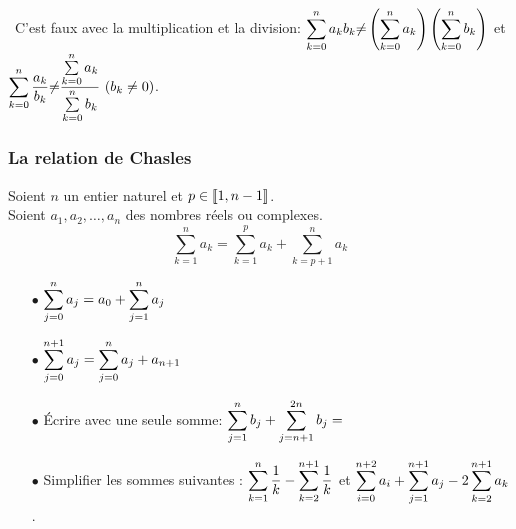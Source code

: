 \documentclass[a4paper, 11pt,reqno]{article}
\begin{document}


\noindent\warning\, C'est faux avec la multiplication et la division: $\displaystyle\sum\limits_{k=0}^n a_kb_k \boldmath{\not=} \left(\sum\limits_{k=0}^n a_k\right) \left(\sum\limits_{k=0}^n b_k\right)$ \; et \; 
$\displaystyle \sum\limits_{k=0}^n \displaystyle\frac{a_k}{b_k} \boldmath{\not=} \displaystyle\frac{\sum\limits_{k=0}^n a_k}{\sum\limits_{k=0}^n b_k}\ (b_k\not= 0)$.


\vspace{0.3cm}

\subsubsection{La relation de Chasles}



\begin{prop} 
Soient $n$ un entier naturel et $p\in\llbracket 1,n-1\rrbracket$.\\
Soient $a_1,a_2,\dots,a_n$ des nombres r\'eels ou complexes.
$$\sum\limits_{k=1}^n a_k=\sum\limits_{k=1}^p a_k +\sum\limits_{k=p+1}^n a_k$$
\end{prop}



\begin{exemples}
\begin{itemize}
\item[$\bullet$] $\displaystyle\sum\limits_{j=0}^{n} a_j= a_0+\displaystyle\sum\limits_{j=1}^{n} a_j $
\item[$\bullet$] $\displaystyle\sum\limits_{j=0}^{n+1} a_j=\displaystyle\sum\limits_{j=0}^{n} a_j +a_{n+1}$
\end{itemize}
\end{exemples}

{\footnotesize 
\begin{exercice} 
\begin{itemize}
\item[$\bullet$] \'Ecrire avec une seule somme: $\displaystyle\sum\limits_{j=1}^n b_j+\sum\limits_{j=n+1}^{2n} b_j = $ %
\item[$\bullet$] Simplifier les sommes suivantes : $\displaystyle\sum\limits_{k=1}^{n} \displaystyle\frac{1}{k}-\sum\limits_{k=2}^{n+1} \displaystyle\frac{1}{k}$ \; et \; $\displaystyle\sum\limits_{i=0}^{n+2} a_i+\sum\limits_{j=1}^{n+1} a_j -2\sum\limits_{k=2}^{n+1} a_k$.
\end{itemize}
\end{exercice}}
\vspace{0.3cm}
\end{document}
